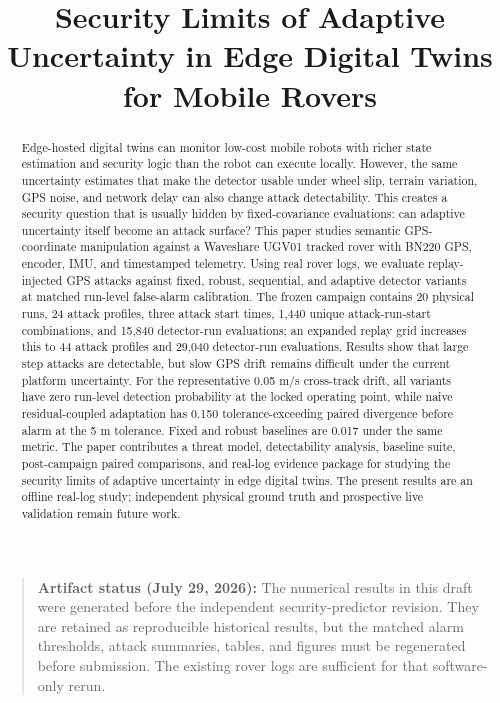 \documentclass[conference]{IEEEtran}
\begin{document}
\title{Security Limits of Adaptive Uncertainty in Edge Digital Twins for Mobile Rovers}

\author{
}

\maketitle

\begin{quote}
\textbf{Artifact status (July 29, 2026):} The numerical results in this draft
were generated before the independent security-predictor revision. They are
retained as reproducible historical results, but the matched alarm thresholds,
attack summaries, tables, and figures must be regenerated before submission.
The existing rover logs are sufficient for that software-only rerun.
\end{quote}

\begin{abstract}
Edge-hosted digital twins can monitor low-cost mobile robots with richer state
estimation and security logic than the robot can execute locally. However, the
same uncertainty estimates that make the detector usable under wheel slip,
terrain variation, GPS noise, and network delay can also change attack
detectability. This creates a security question that is usually hidden by
fixed-covariance evaluations: can adaptive uncertainty itself become an attack
surface? This paper studies semantic GPS-coordinate manipulation against
a Waveshare UGV01 tracked rover with BN220 GPS, encoder, IMU, and timestamped
telemetry. Using real rover logs, we evaluate replay-injected GPS attacks
against fixed, robust, sequential, and adaptive detector variants at matched
run-level false-alarm calibration. The frozen campaign contains 20 physical
runs, 24 attack profiles, three attack start times, 1,440 unique
attack-run-start combinations, and 15,840 detector-run evaluations; an expanded
replay grid increases this to 44 attack profiles and 29,040 detector-run
evaluations. Results show that large step attacks are detectable, but slow GPS
drift remains difficult under the current platform uncertainty. For the
representative 0.05 m/s cross-track drift, all variants have zero run-level
detection probability at the locked operating point, while naive
residual-coupled adaptation has 0.150 tolerance-exceeding paired divergence
before alarm at the 5 m tolerance. Fixed and robust baselines are 0.017 under
the same metric. The paper contributes a threat model, detectability analysis,
baseline suite, post-campaign paired comparisons, and real-log evidence package
for studying the security limits of adaptive uncertainty in edge digital
twins. The present results are an offline real-log study; independent physical
ground truth and prospective live validation remain future work.
\end{abstract}
\end{document}
